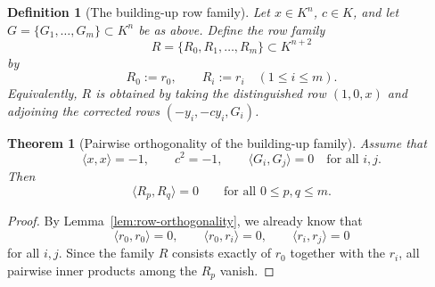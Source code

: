 \documentclass[12pt]{article}
\newtheorem{defn}{Definition}[section]
\newtheorem{theorem}{Theorem}[section]
\begin{document}
\begin{defn}[The building-up row family]
\label{def:buildRows-family}
Let $x\in K^n$, $c\in K$, and let $G=\{G_1,\dots,G_m\}\subset K^n$ be as above. Define the row family
\[
R=\{R_0,R_1,\dots,R_m\}\subset K^{n+2}
\]
by
\[
R_0:=r_0,
\qquad
R_i:=r_i \quad (1\le i\le m).
\]
Equivalently, $R$ is obtained by taking the distinguished row $(1,0,x)$ and adjoining the corrected rows $(-y_i,-c y_i,G_i)$.
\end{defn}

\begin{theorem}[Pairwise orthogonality of the building-up family]
\label{thm:buildrows-orth}
Assume that
\[
\langle x,x\rangle=-1,
\qquad
c^2=-1,
\qquad
\langle G_i,G_j\rangle=0 \quad \text{for all } i,j.
\]
Then
\[
\langle R_p,R_q\rangle = 0
\qquad
\text{for all } 0\le p,q\le m.
\]
\end{theorem}

\begin{proof}
By Lemma~\ref{lem:row-orthogonality}, we already know that
\[
\langle r_0,r_0\rangle=0,\qquad
\langle r_0,r_i\rangle=0,\qquad
\langle r_i,r_j\rangle=0
\]
for all $i,j$. Since the family $R$ consists exactly of $r_0$ together with the $r_i$, all pairwise inner products among the $R_p$ vanish. 
\end{proof}
\end{document}
